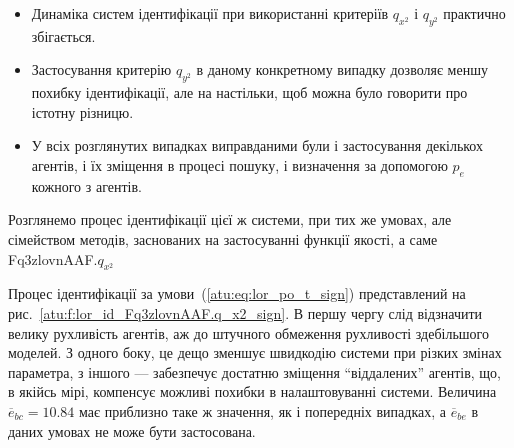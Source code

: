 \begin{itemize}

  \item
   Динаміка систем ідентифікації при використанні критеріїв $ q_{x^2} $ і $ q_{y^2} $ практично збігається.

  \item
    Застосування критерію
    $ q_{y^2} $ в даному конкретному випадку дозволяє меншу похибку
    ідентифікації, але на настільки, щоб можна було говорити про
    істотну різницю.

  \item
    У всіх розглянутих випадках виправданими були і застосування
    декількох агентів, і їх зміщення в процесі пошуку, і визначення
    за допомогою
    $p_e$ кожного з агентів.

\end{itemize}

Розглянемо процес ідентифікації цієї ж системи, при тих же
умовах, але сімейством методів, заснованих на застосуванні
функції якості, а саме
Fq3zlovnAAF.$q_{x^2}$

Процес ідентифікації за умови~(\ref{atu:eq:lor_po_t_sign}) представлений
на рис.~\ref{atu:f:lor_id_Fq3zlovnAAF.q_x2_sign}. В першу чергу слід відзначити
велику рухливість агентів, аж до штучного обмеження рухливості
здебільшого моделей. З одного боку, це дещо зменшує швидкодію
системи при різких змінах параметра, з іншого --- забезпечує
достатню зміщення ``віддалених'' агентів, що, в якійсь мірі,
компенсує можливі похибки в налаштовуванні системи. Величина
$ \overline{e}_{bc} = 10.84 $ має приблизно таке ж значення, як і попередніх
випадках, а
$ \overline{e}_{be} $ в даних умовах не може бути застосована.

